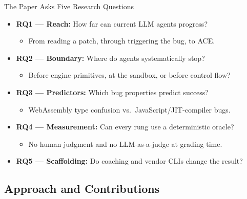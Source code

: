 \documentclass[aspectratio=169,t]{beamer}
\begin{document}
\begin{frame}{The Paper Asks Five Research Questions}
  \begin{itemize}\small
    \item \textbf{RQ1 --- Reach:} How far can current LLM agents progress?
      \begin{itemize}
        \item From reading a patch, through triggering the bug, to ACE.
      \end{itemize}
    \item \textbf{RQ2 --- Boundary:} Where do agents systematically stop?
      \begin{itemize}
        \item Before engine primitives, at the sandbox, or before control flow?
      \end{itemize}
    \item \textbf{RQ3 --- Predictors:} Which bug properties predict success?
      \begin{itemize}
        \item WebAssembly type confusion vs.\ JavaScript/JIT-compiler bugs.
      \end{itemize}
    \item \textbf{RQ4 --- Measurement:} Can every rung use a deterministic oracle?
      \begin{itemize}
        \item No human judgment and no LLM-as-a-judge at grading time.
      \end{itemize}
    \item \textbf{RQ5 --- Scaffolding:} Do coaching and vendor CLIs change the result?
  \end{itemize}
\end{frame}

\subsection{Approach and Contributions}
\end{document}

